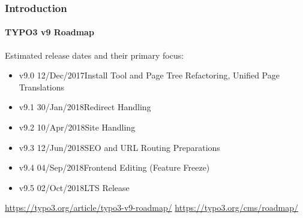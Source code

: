 \begin{frame}[fragile]
	\frametitle{Introduction}
	\framesubtitle{TYPO3 v9 Roadmap}

	Estimated release dates and their primary focus:

	\begin{itemize}

		\item v9.0 \tabto{1.1cm}12/Dec/2017\tabto{3.4cm}Install Tool and Page Tree Refactoring,\newline
			\tabto{3.4cm}Unified Page Translations
		\item v9.1 \tabto{1.1cm}30/Jan/2018\tabto{3.4cm}Redirect Handling
		\item v9.2 \tabto{1.1cm}10/Apr/2018\tabto{3.4cm}Site Handling
		\item
			\begingroup
				\color{typo3orange}
					v9.3 \tabto{1.1cm}12/Jun/2018\tabto{3.4cm}SEO and URL Routing Preparations
			\endgroup
		\item v9.4 \tabto{1.1cm}04/Sep/2018\tabto{3.4cm}Frontend Editing (Feature Freeze)
		\item v9.5 \tabto{1.1cm}02/Oct/2018\tabto{3.4cm}LTS Release

	\end{itemize}

	\smaller
		\url{https://typo3.org/article/typo3-v9-roadmap/}\newline
		\url{https://typo3.org/cms/roadmap/}
	\normalsize

\end{frame}

